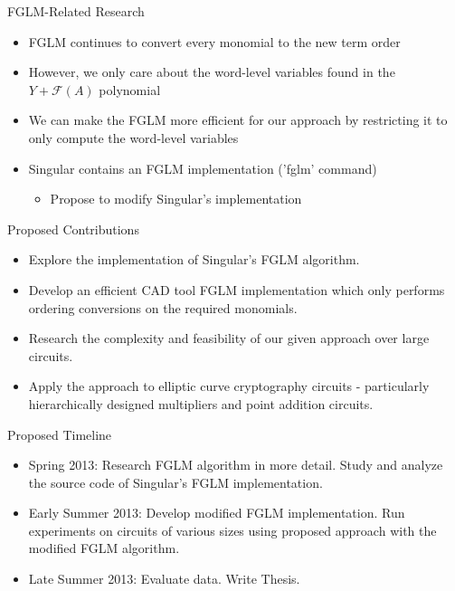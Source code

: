 \documentclass[xcolor=dvipsnames]{beamer}
\newcommand{\F}{{\mathcal{F}}}
\begin{document}

\begin{frame}{\large {FGLM-Related Research}}
\begin{itemize}
\item FGLM continues to convert every monomial to the new term order
\item However, we only care about the word-level variables found in the $Y + \F(A)$ polynomial
\item We can make the FGLM more efficient for our approach by restricting it to only compute the word-level variables
\item Singular contains an FGLM implementation ('fglm' command)
	\begin{itemize}
	\item Propose to modify Singular's implementation
	\end{itemize}
\end{itemize}
\end{frame}


\begin{frame}{\large {Proposed Contributions}}
\begin{itemize}
\item Explore the implementation of Singular's FGLM algorithm.
\item Develop an efficient CAD tool FGLM implementation which only performs ordering conversions on the required monomials. 
\item Research the complexity and feasibility of our given approach over large circuits.
\item Apply the approach to elliptic curve cryptography circuits - particularly hierarchically designed multipliers and point addition circuits.
\end{itemize}
\end{frame}


\begin{frame}{\large {Proposed Timeline}}
\begin{itemize}
\item Spring 2013: Research FGLM algorithm in more detail. Study and analyze the source code of Singular's FGLM implementation.
\item Early Summer 2013: Develop modified FGLM implementation. Run experiments on circuits of various sizes using proposed approach with the modified FGLM algorithm.
\item Late Summer 2013: Evaluate data. Write Thesis.
\end{itemize}
\end{frame}
\end{document}
